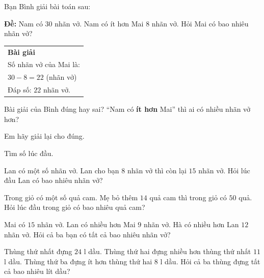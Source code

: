 \documentclass[../main.tex]{subfiles}
\begin{document}
\begin{bt}
    Bạn Bình giải bài toán sau:
    \par\smallskip\noindent\textbf{Đề:} Nam có $30$ nhãn vở. Nam có ít hơn Mai $8$ nhãn vở. Hỏi Mai có bao nhiêu nhãn vở?
    \par\smallskip
    {\noindent\hspace*{0.45cm}\begin{tabular}{|l|}
        \hline
        \textbf{Bài giải} \\
        Số nhãn vở của Mai là: \\
        $30-8=22$ (nhãn vở) \\
        Đáp số: $22$ nhãn vở. \\
        \hline
    \end{tabular}}
    \begin{listEX}
        \item Bài giải của Bình đúng hay sai? \TTcham[2cm]\hspace{0.4cm} ``Nam có \textbf{ít hơn} Mai'' thì ai có nhiều nhãn vở hơn? \TTcham[2.5cm]
        \item Em hãy giải lại cho đúng.
    \end{listEX}
\end{bt}
\begin{bt}
    Tìm số lúc đầu.
    \begin{listEX}
        \item Lan có một số nhãn vở. Lan cho bạn $8$ nhãn vở thì còn lại $15$ nhãn vở. Hỏi lúc đầu Lan có bao nhiêu nhãn vở?

        \item Trong giỏ có một số quả cam. Mẹ bỏ thêm $14$ quả cam thì trong giỏ có $50$ quả. Hỏi lúc đầu trong giỏ có bao nhiêu quả cam?
    \end{listEX}
\end{bt}
\begin{bt}
    Mai có $15$ nhãn vở. Lan có nhiều hơn Mai $9$ nhãn vở. Hà có nhiều hơn Lan $12$ nhãn vở. Hỏi cả ba bạn có tất cả bao nhiêu nhãn vở?
\end{bt}

\begin{bt}
    Thùng thứ nhất đựng $24$ l dầu. Thùng thứ hai đựng nhiều hơn thùng thứ nhất $11$ l dầu. Thùng thứ ba đựng ít hơn thùng thứ hai $8$ l dầu. Hỏi cả ba thùng đựng tất cả bao nhiêu lít dầu?
\end{bt}
\end{document}
